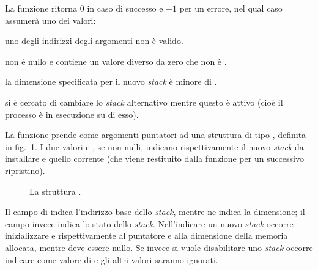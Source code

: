 \begin{funcproto}{
}

{La funzione ritorna $0$ in caso di successo e $-1$ per un errore, nel qual
  caso  assumerà uno dei valori: 
  \begin{errlist}
  \item[\errcode{EFAULT}] uno degli indirizzi degli argomenti non è valido.
  \item[\errcode{EINVAL}]  non è nullo e  contiene un
  valore diverso da zero che non è .
  \item[\errcode{ENOMEM}] la dimensione specificata per il nuovo
    \textit{stack} è minore di .
  \item[\errcode{EPERM}] si è cercato di cambiare lo \textit{stack}
    alternativo mentre questo è attivo (cioè il processo è in esecuzione su di
    esso).
  \end{errlist}
}
\end{funcproto}

La funzione prende come argomenti puntatori ad una struttura di tipo
, definita in fig.~\ref{fig:sig_stack_t}. I due valori
 e , se non nulli, indicano rispettivamente il nuovo
\textit{stack} da installare e quello corrente (che viene restituito dalla
funzione per un successivo ripristino).

\begin{figure}[!htb]
  \footnotesize \centering
  \begin{minipage}[c]{0.8\textwidth}
  \end{minipage} 
  \normalsize 
  \caption{La struttura .} 
  \label{fig:sig_stack_t}
\end{figure}

Il campo  di  indica l'indirizzo base dello
\textit{stack}, mentre  ne indica la dimensione; il campo
 invece indica lo stato dello \textit{stack}.  Nell'indicare un
nuovo \textit{stack} occorre inizializzare  e 
rispettivamente al puntatore e alla dimensione della memoria allocata, mentre
 deve essere nullo.  Se invece si vuole disabilitare uno
\textit{stack} occorre indicare  come valore di
 e gli altri valori saranno ignorati.

